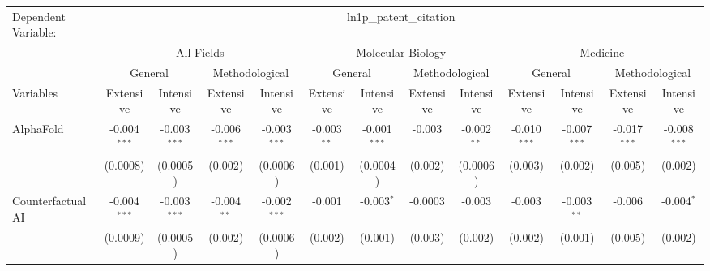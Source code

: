 \begingroup
\centering
\begin{tabular}{lcccccccccccc}
   \tabularnewline \midrule \midrule
   Dependent Variable: & \multicolumn{12}{c}{ln1p\_patent\_citation}\\
 & \multicolumn{4}{c}{All Fields} & \multicolumn{4}{c}{Molecular Biology} & \multicolumn{4}{c}{Medicine} \\
\cmidrule(lr){2-5} \cmidrule(lr){6-9} \cmidrule(lr){10-13}
 & \multicolumn{2}{c}{General} & \multicolumn{2}{c}{Methodological} & \multicolumn{2}{c}{General} & \multicolumn{2}{c}{Methodological} & \multicolumn{2}{c}{General} & \multicolumn{2}{c}{Methodological} \\
\cmidrule(lr){2-3} \cmidrule(lr){4-5} \cmidrule(lr){6-7} \cmidrule(lr){8-9} \cmidrule(lr){10-11} \cmidrule(lr){12-13}
Variables & \multicolumn{1}{c}{Extensive} & \multicolumn{1}{c}{Intensive} & \multicolumn{1}{c}{Extensive} & \multicolumn{1}{c}{Intensive} & \multicolumn{1}{c}{Extensive} & \multicolumn{1}{c}{Intensive} & \multicolumn{1}{c}{Extensive} & \multicolumn{1}{c}{Intensive} & \multicolumn{1}{c}{Extensive} & \multicolumn{1}{c}{Intensive} & \multicolumn{1}{c}{Extensive} & \multicolumn{1}{c}{Intensive} \\
\cmidrule(lr){1-1}\cmidrule(lr){2-2} \cmidrule(lr){3-3} \cmidrule(lr){4-4} \cmidrule(lr){5-5} \cmidrule(lr){6-6} \cmidrule(lr){7-7} \cmidrule(lr){8-8} \cmidrule(lr){9-9} \cmidrule(lr){10-10} \cmidrule(lr){11-11} \cmidrule(lr){12-12} \cmidrule(lr){13-13}
   AlphaFold                                & -0.004$^{***}$ & -0.003$^{***}$  & -0.006$^{***}$ & -0.003$^{***}$  & -0.003$^{**}$ & -0.001$^{***}$  & -0.003  & -0.002$^{**}$  & -0.010$^{***}$ & -0.007$^{***}$ & -0.017$^{***}$ & -0.008$^{***}$\\   
                                            & (0.0008)       & (0.0005)        & (0.002)        & (0.0006)        & (0.001)       & (0.0004)        & (0.002) & (0.0006)       & (0.003)        & (0.002)        & (0.005)        & (0.002)\\   
   Counterfactual AI                        & -0.004$^{***}$ & -0.003$^{***}$  & -0.004$^{**}$  & -0.002$^{***}$  & -0.001        & -0.003$^{*}$    & -0.0003 & -0.003         & -0.003         & -0.003$^{**}$  & -0.006         & -0.004$^{*}$\\   
                                            & (0.0009)       & (0.0005)        & (0.002)        & (0.0006)        & (0.002)       & (0.001)         & (0.003) & (0.002)        & (0.002)        & (0.001)        & (0.005)        & (0.002)\\   

\end{tabular}
